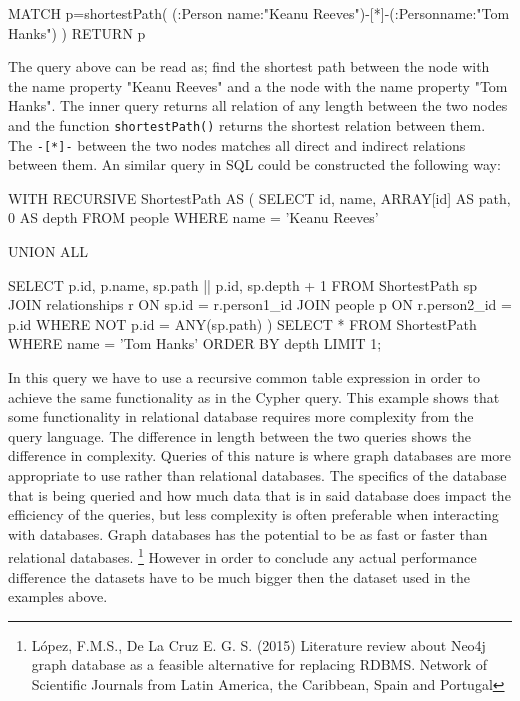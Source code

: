 \begin{sqlCode}
MATCH p=shortestPath(
(:Person {name:"Keanu Reeves"})-[*]-(:Person{name:"Tom Hanks"})
) RETURN p
\end{sqlCode}

The query above can be read as; find the shortest path between the node with the name property "Keanu Reeves" and a the node with the name property "Tom Hanks". The inner query returns all relation of any length between the two nodes and the function \texttt{shortestPath()} returns the shortest relation between them. The \texttt{-[*]-} between the two nodes matches all direct and indirect relations between them. An similar query in SQL could be constructed the following way:
\begin{sqlCode}
WITH RECURSIVE ShortestPath AS (
SELECT
  id,
  name,
  ARRAY[id] AS path,
  0 AS depth
FROM
  people
WHERE
  name = 'Keanu Reeves'

UNION ALL

SELECT
  p.id,
  p.name,
  sp.path || p.id,
  sp.depth + 1
FROM
  ShortestPath sp
JOIN
  relationships r ON sp.id = r.person1_id
JOIN
  people p ON r.person2_id = p.id
WHERE
  NOT p.id = ANY(sp.path)
  )
SELECT *
FROM ShortestPath
WHERE name = 'Tom Hanks'
ORDER BY depth
LIMIT 1;

\end{sqlCode}
In this query we have to use a recursive common table expression in order to achieve the same functionality as in the Cypher query. This example shows that some functionality in relational database requires more complexity from the query language. The difference in length between the two queries shows the difference in complexity. Queries of this nature is where graph databases are more appropriate to use rather than relational databases. The specifics of the database that is being queried and how much data that is in said database does impact the efficiency of the queries, but less complexity is often preferable when interacting with databases. Graph databases has the potential to be as fast or faster than relational databases. \footnote{López, F.M.S., De La Cruz
E. G. S. (2015) Literature review about Neo4j graph database
as a feasible alternative for replacing RDBMS. Network of Scientific Journals from Latin America, the Caribbean, Spain and Portugal} However in order to conclude any actual performance difference the datasets have to be much bigger then the dataset used in the examples above.



